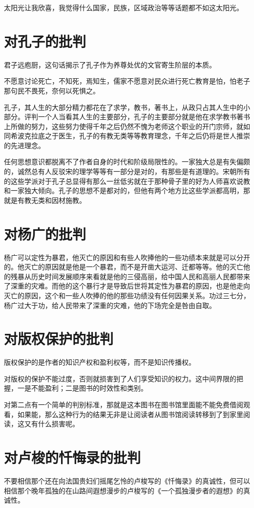 \documentclass[12pt,oneside]{book}
\begin{document}
太阳光让我欣喜，我觉得什么国家，民族，区域政治等等话题都不如这太阳光。

\chapter{对孔子的批判}
君子远庖厨，这句话揭示了孔子作为养尊处优的文官寄生阶层的本质。

不愿意讨论死亡，不知死，焉知生，儒家不愿意对民众进行死亡教育是怕，怕老子那句民不畏死，奈何以死惧之。

孔子，其人生的大部分精力都花在了求学，教书，著书上，从政只占其人生中的小部分。评判一个人当看其人生的主要部分，孔子的主要部分就是他在求学教书著书上所做的努力，这些努力使得千年之后仍然不愧为老师这个职业的开门宗师，就如同希波克拉底之于医生，孔子的有教无类等等教育理念，千年之后仍将是世人推崇的先进理念。

任何思想意识都脱离不了作者自身的时代和阶级局限性的。一家独大总是有失偏颇的，诚然总有人反驳宋的理学等等有一部分是对的，有那些是有道理的。宋朝所有的这些学派对于孔子总显得有那么一丝低劣就在于那种骨子里的好为人师喜欢说教和一家独大倾向。孔子的思想不是都对的，但他有两个地方比这些学派都高明，那就是有教无类和因材施教。​

\chapter{对杨广的批判}
杨广可以定性为暴君，他灭亡的原因和有些人吹捧他的一些功绩本来就是可以分开的。他灭亡的原因就是他是一个暴君，而不是开凿大运河、迁都等等。他的灭亡他的残暴从历史时间发展顺序来看就是他的三侵高丽，给中国人民和高丽人民都带来了深重的灾难。而他的这个暴行才是导致后世将其定性为暴君的原因，也是他走向灭亡的原因，这个和一些人吹捧的他的那些功绩没有任何因果关系。功过三七分，杨广过大于功，给人民带来了深重的灾难，他的下场完全是咎由自取。

\chapter{对版权保护的批判}
版权保护的是作者的知识产权和盈利权等，而不是知识传播权。

对版权的保护不能过度，否则就损害到了人们享受知识的权力。这中间界限的把握，一是不能盈利；二是图书的时效性和类别。

对第二点有一个简单的判别标准，那就是这本图书在图书馆里面能不能免费借阅观看，如果能，那么这种行为的结果无非是让阅读者从图书馆阅读转移到了到家里阅读，这又有什么损害呢。




\chapter{对卢梭的忏悔录的批判}
不要相信那个还在向法国贵妇们摇尾乞怜的卢梭写的《忏悔录》的真诚性，但可以相信那个晚年孤独的在山路间遐想漫步的卢梭写的《一个孤独漫步者的遐想》的真诚性。
\end{document}
